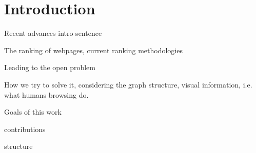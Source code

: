 \section{Introduction}

Recent advances intro sentence

The ranking of webpages, current ranking methodologies

Leading to the open problem

How we try to solve it, considering the graph structure, visual information, i.e. what humans browsing do.

Goals of this work

contributions

structure
